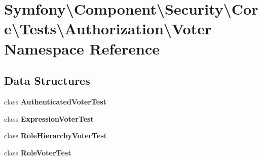 \section{Symfony\textbackslash{}Component\textbackslash{}Security\textbackslash{}Core\textbackslash{}Tests\textbackslash{}Authorization\textbackslash{}Voter Namespace Reference}
\label{namespace_symfony_1_1_component_1_1_security_1_1_core_1_1_tests_1_1_authorization_1_1_voter}
\subsection*{Data Structures}
\begin{DoxyCompactItemize}
\item 
class {\bf Authenticated\+Voter\+Test}
\item 
class {\bf Expression\+Voter\+Test}
\item 
class {\bf Role\+Hierarchy\+Voter\+Test}
\item 
class {\bf Role\+Voter\+Test}
\end{DoxyCompactItemize}
